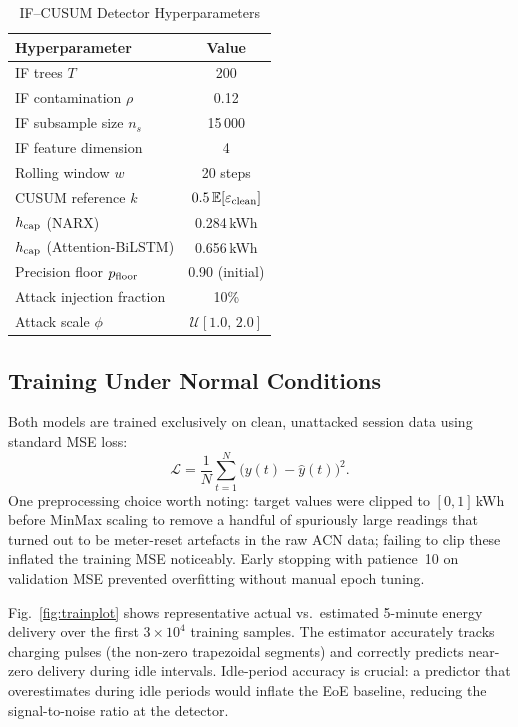 \documentclass[journal]{IEEEtran}
\begin{document}
\begin{table}[!t]
\caption{IF--CUSUM Detector Hyperparameters}
\label{tab:detector}
\centering
\begin{tabular}{|l|c|}
\hline
\textbf{Hyperparameter}        & \textbf{Value} \\
\hline
IF trees $T$                    & 200 \\
IF contamination $\rho$         & 0.12 \\
IF subsample size $n_s$         & 15\,000 \\
IF feature dimension            & 4 \\
Rolling window $w$              & 20 steps \\
CUSUM reference $k$             & $0.5\,\mathbb{E}[\varepsilon_{\rm clean}]$ \\
$h_{\rm cap}$ (NARX)           & 0.284\,kWh \\
$h_{\rm cap}$ (Attention-BiLSTM) & 0.656\,kWh \\
Precision floor $p_{\rm floor}$ & 0.90 (initial) \\
Attack injection fraction       & 10\% \\
Attack scale $\phi$             & $\mathcal{U}[1.0,\,2.0]$ \\
\hline
\end{tabular}
\end{table}

\subsection{Training Under Normal Conditions}

Both models are trained exclusively on clean, unattacked session
data using standard MSE loss:
\begin{equation}
  \mathcal{L} = \frac{1}{N}\sum_{t=1}^{N}
  \bigl(y(t) - \hat{y}(t)\bigr)^2.
  \label{eq:mse}
\end{equation}
One preprocessing choice worth noting: target values were clipped
to $[0,1]$\,kWh before MinMax scaling to remove a handful of
spuriously large readings that turned out to be meter-reset
artefacts in the raw ACN data; failing to clip these inflated
the training MSE noticeably.
Early stopping with patience~10 on validation MSE prevented
overfitting without manual epoch tuning.

Fig.~\ref{fig:trainplot} shows representative actual vs.\ estimated
5-minute energy delivery over the first $3\times10^4$ training samples.
The estimator accurately tracks charging pulses (the non-zero
trapezoidal segments) and correctly predicts near-zero delivery
during idle intervals.
Idle-period accuracy is crucial: a predictor that overestimates
during idle periods would inflate the EoE baseline, reducing the
signal-to-noise ratio at the detector.
\end{document}
